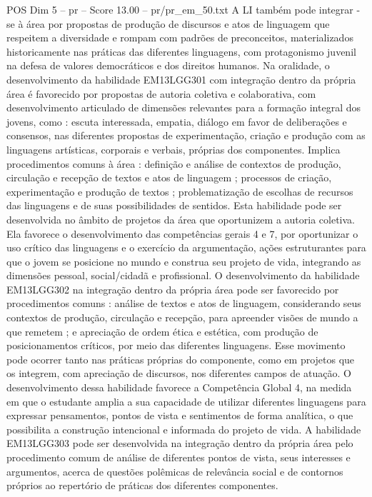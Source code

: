 \begin{textsample}{POS Dim 5 – pr – Score 13.00 – pr/pr\_em\_50.txt}
A LI também pode integrar -se à área por propostas de produção de discursos e atos de linguagem que respeitem a diversidade e rompam com padrões de preconceitos, materializados historicamente nas práticas das diferentes linguagens, com protagonismo juvenil na defesa de valores democráticos e dos direitos humanos.
Na oralidade, o desenvolvimento da habilidade EM13LGG301 com integração dentro da própria área é favorecido por propostas de autoria coletiva e colaborativa, com desenvolvimento articulado de dimensões relevantes para a formação integral dos jovens, como : escuta interessada, empatia, diálogo em favor de deliberações e consensos, nas diferentes propostas de experimentação, criação e produção com as linguagens artísticas, corporais e verbais, próprias dos componentes.
Implica procedimentos comuns à área : definição e análise de contextos de produção, circulação e recepção de textos e atos de linguagem ; processos de criação, experimentação e produção de textos ; problematização de escolhas de recursos das linguagens e de suas possibilidades de sentidos.
Esta habilidade pode ser desenvolvida no âmbito de projetos da área que oportunizem a autoria coletiva.
Ela favorece o desenvolvimento das competências gerais 4 e 7, por oportunizar o uso crítico das linguagens e o exercício da argumentação, ações estruturantes para que o jovem se posicione no mundo e construa seu projeto de vida, integrando as dimensões pessoal, social/cidadã e profissional.
O desenvolvimento da habilidade EM13LGG302 na integração dentro da própria área pode ser favorecido por procedimentos comuns : análise de textos e atos de linguagem, considerando seus contextos de produção, circulação e recepção, para apreender visões de mundo a que remetem ; e apreciação de ordem ética e estética, com produção de posicionamentos críticos, por meio das diferentes linguagens.
Esse movimento pode ocorrer tanto nas práticas próprias do componente, como em projetos que os integrem, com apreciação de discursos, nos diferentes campos de atuação.
O desenvolvimento dessa habilidade favorece a Competência Global 4, na medida em que o estudante amplia a sua capacidade de utilizar diferentes linguagens para expressar pensamentos, pontos de vista e sentimentos de forma analítica, o que possibilita a construção intencional e informada do projeto de vida.
A habilidade EM13LGG303 pode ser desenvolvida na integração dentro da própria área pelo procedimento comum de análise de diferentes pontos de vista, seus interesses e argumentos, acerca de questões polêmicas de relevância social e de contornos próprios ao repertório de práticas dos diferentes componentes.

\end{textsample}
